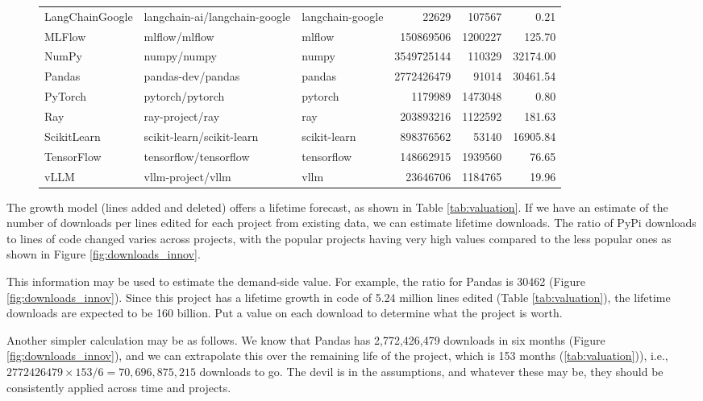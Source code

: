 \documentclass[conference]{IEEEtran}
\begin{document}
\begin{figure}
{\begin{tabular}{lllrrr}
LangChainGoogle &  langchain-ai/langchain-google &  langchain-google & 22629 & 107567 & 0.21 \\
MLFlow &  mlflow/mlflow &  mlflow & 150869506 & 1200227 & 125.70 \\
NumPy &  numpy/numpy &  numpy & 3549725144 & 110329 & 32174.00 \\
Pandas &  pandas-dev/pandas &  pandas & 2772426479 & 91014 & 30461.54 \\
PyTorch &  pytorch/pytorch &  pytorch & 1179989 & 1473048 & 0.80 \\
Ray &  ray-project/ray &  ray & 203893216 & 1122592 & 181.63 \\
ScikitLearn &  scikit-learn/scikit-learn &  scikit-learn & 898376562 & 53140 & 16905.84 \\
TensorFlow &  tensorflow/tensorflow &  tensorflow & 148662915 & 1939560 & 76.65 \\
vLLM &  vllm-project/vllm &  vllm & 23646706 & 1184765 & 19.96 \\
\bottomrule
\end{tabular}
}
\end{figure}

The growth model (lines added and deleted) offers a lifetime forecast, as shown in Table \ref{tab:valuation}. If we have an estimate of the number of downloads per lines edited for each project from existing data, we can estimate lifetime downloads. The ratio of PyPi downloads to lines of code changed varies across projects, with the popular projects having very high values compared to the less popular ones as shown in Figure \ref{fig:downloads_innov}. 

This information may be used to estimate the demand-side value. For example, the ratio for Pandas is 30462 (Figure \ref{fig:downloads_innov}). Since this project has a lifetime growth in code of 5.24 million lines edited (Table \ref{tab:valuation}), the lifetime downloads are expected to be 160 billion. Put a value on each download to determine what the project is worth. 

Another simpler calculation may be as follows. We know that Pandas has 2,772,426,479 downloads in six months (Figure \ref{fig:downloads_innov}), and we can extrapolate this over the remaining life of the project, which is 153 months (\ref{tab:valuation})), i.e., $2772426479 \times 153/6 = 70,696,875,215$ downloads to go. The devil is in the assumptions, and whatever these may be, they should be consistently applied across time and projects. 
\end{document}
